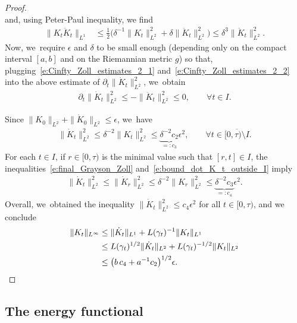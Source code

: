 \begin{proof}
\begin{equation}
\end{equation}
and, using Peter-Paul inequality, we find
\begin{equation}
\label{e:Cinfty_Zoll_estimates_2_2}
\begin{split}
\|K_t \ddot K_t\|_{L^1}
&\leq
\tfrac12\big(\delta^{-1}\|K_t\|_{L^2}^2+ \delta\|\ddot K_t\|_{L^2}^2\big)
\leq
\delta^3 \|\ddot K_t\|_{L^2}^2.
\end{split}
\end{equation}
Now, we~require $\epsilon$ and $\delta$ to be small enough (depending only on the compact interval $[a,b]$ and on the Riemannian metric $g$) so that, plugging~\eqref{e:Cinfty_Zoll_estimates_2_1} and~\eqref{e:Cinfty_Zoll_estimates_2_2} into the above estimate of $\partial_t\|\dot K_t\|_{L^2}^2$, we~obtain
\begin{align}
\label{e:final_Grayson_Zoll}
\partial_t\|\dot K_t\|_{L^2}^2
\leq
-\|\ddot K_t\|_{L^2}^2
\leq
0,
\qquad\forall t\in I.
\end{align}

Since $\|K_0\|_{L^2}+\|\dot K_0\|_{L^2}\leq\epsilon$, we~have
\begin{align}
\label{e:bound_dot_K_t_outside_I}
\|\dot K_t\|_{L^2}^2\leq \delta^{-2}\|K_t\|_{L^2}^2\leq \underbrace{\delta^{-2}c_2}_{=:c_3}\epsilon^2,
\qquad\forall t\in\overline{[0,\tau)\setminus I}.
\end{align}
For each $t\in I$, if $r\in[0,\tau)$ is the minimal value such that $[r,t]\in I$, the inequalities~\eqref{e:final_Grayson_Zoll} and~\eqref{e:bound_dot_K_t_outside_I} imply
\begin{align*}
\|\dot K_t\|_{L^2}^2
\leq
\|\dot K_r\|_{L^2}^2
\leq
\delta^{-2}\|K_{r}\|_{L^2}^2
\leq
\underbrace{\delta^{-2} c_3}_{=:c_4} \epsilon^2.
\end{align*}
Overall, we~obtained the inequality $\|\dot K_t\|_{L^2}^2\leq c_4\epsilon^2$ for all $t\in[0,\tau)$, and we conclude
\begin{align*}
\|K_t\|_{L^\infty}
&\leq
\|\dot K_t\|_{L^1} + L(\gamma_t)^{-1}\|K_t\|_{L^1}\\
&\leq
L(\gamma_t)^{1/2}\|\dot K_t\|_{L^2} + L(\gamma_t)^{-1/2}\|K_t\|_{L^2}\\
&\leq\big(b\,c_4 + a^{-1}c_2\big)^{1/2}\epsilon.
\qedhere
\end{align*}
\end{proof}

\subsection{The energy functional}\label{ss:energy}

